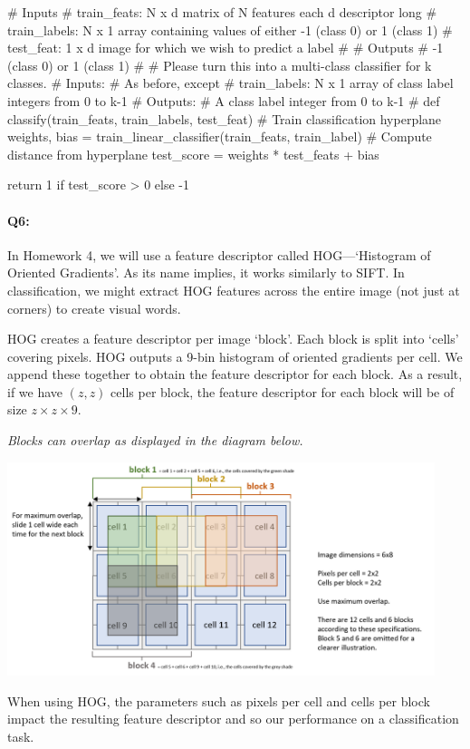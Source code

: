 \begin{python}
# Inputs
#   train_feats: N x d matrix of N features each d descriptor long
#   train_labels: N x 1 array containing values of either -1 (class 0) or 1 (class 1)
#   test_feat: 1 x d image for which we wish to predict a label
#
# Outputs
#   -1 (class 0) or 1 (class 1)
#
# Please turn this into a multi-class classifier for k classes.
# Inputs:
#    As before, except
#    train_labels: N x 1 array of class label integers from 0 to k-1
# Outputs:
#    A class label integer from 0 to k-1
#
def classify(train_feats, train_labels, test_feat)
    # Train classification hyperplane
    weights, bias = train_linear_classifier(train_feats, train_label)
    # Compute distance from hyperplane
    test_score = weights * test_feats + bias

    return 1 if test_score > 0 else -1
\end{python}


\pagebreak

\paragraph{Q6:} In Homework 4, we will use a feature descriptor called HOG---`Histogram of Oriented Gradients'. As its name implies, it works similarly to SIFT. In classification, we might extract HOG features across the entire image (not just at corners) to create visual words.

HOG creates a feature descriptor per image `block'. Each block is split into `cells' covering pixels. HOG outputs a 9-bin histogram of oriented gradients per cell. We append these together to obtain the feature descriptor for each block. As a result, if we have $(z,z)$ cells per block, the feature descriptor for each block will be of size $z \times z \times 9$. 

\emph{Blocks can overlap as displayed in the diagram below.}
%
\begin{center}
    \includegraphics[clip, trim = {0.2cm, 0.35cm, 0.2cm, 0.2cm}, width=12.5cm]{hog-diagram.png} %
\end{center}
%
When using HOG, the parameters such as pixels per cell and cells per block impact the resulting feature descriptor and so our performance on a classification task.

